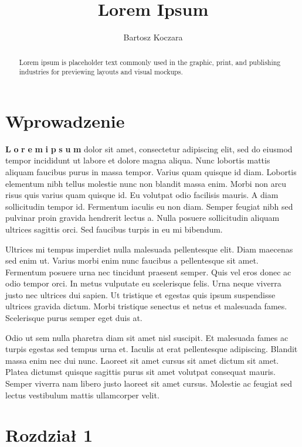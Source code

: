 \documentclass[12pt, a4paper]{article}
\title{Lorem Ipsum}
\author{Bartosz Koczara}
\begin{document}
\maketitle

\begin{abstract}
  Lorem ipsum is placeholder text commonly used in the graphic, print, and publishing industries for previewing layouts and visual mockups.
\end{abstract}

\section{Wprowadzenie}  
\textbf L \textbf o \textbf r \textbf e \textbf m \textbf i \textbf p \textbf s \textbf u \textbf m dolor sit amet, consectetur adipiscing elit, sed do eiusmod tempor incididunt ut labore et dolore magna aliqua. Nunc lobortis mattis aliquam faucibus purus in massa tempor. Varius quam quisque id diam. Lobortis elementum nibh tellus molestie nunc non blandit massa enim. Morbi non arcu risus quis varius quam quisque id. Eu volutpat odio facilisis mauris. A diam sollicitudin tempor id. Fermentum iaculis eu non diam. Semper feugiat nibh sed pulvinar proin gravida hendrerit lectus a. Nulla posuere sollicitudin aliquam ultrices sagittis orci. Sed faucibus turpis in eu mi bibendum.

Ultrices mi tempus imperdiet nulla malesuada pellentesque elit. Diam maecenas sed enim ut. Varius morbi enim nunc faucibus a pellentesque sit amet. Fermentum posuere urna nec tincidunt praesent semper. Quis vel eros donec ac odio tempor orci. In metus vulputate eu scelerisque felis. Urna neque viverra justo nec ultrices dui sapien. Ut tristique et egestas quis ipsum suspendisse ultrices gravida dictum. Morbi tristique senectus et netus et malesuada fames. Scelerisque purus semper eget duis at.

Odio ut sem nulla pharetra diam sit amet nisl suscipit. Et malesuada fames ac turpis egestas sed tempus urna et. Iaculis at erat pellentesque adipiscing. Blandit massa enim nec dui nunc. Laoreet sit amet cursus sit amet dictum sit amet. Platea dictumst quisque sagittis purus sit amet volutpat consequat mauris. Semper viverra nam libero justo laoreet sit amet cursus. Molestie ac feugiat sed lectus vestibulum mattis ullamcorper velit. 


\section{Rozdział 1}
\end{document}

